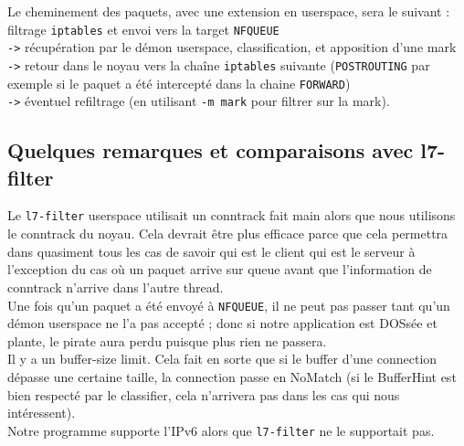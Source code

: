 Le cheminement des paquets, avec une extension en userspace, sera le suivant :\\
filtrage \verb+iptables+ et envoi vers la target \verb+NFQUEUE+\\
\verb+->+ récupération par le démon userspace, classification, et apposition d'une mark\\
\verb+->+ retour dans le noyau vers la chaîne \verb+iptables+ suivante (\verb+POSTROUTING+ par exemple si le paquet a été intercepté dans la chaine \verb+FORWARD+)\\
\verb+->+ éventuel refiltrage (en utilisant \verb+-m mark+ pour filtrer sur la mark).


\subsection{Quelques remarques et comparaisons avec l7-filter}
Le \verb+l7-filter+ userspace utilisait un conntrack fait main alors que nous utilisons le conntrack du noyau. Cela devrait être plus efficace parce que cela permettra dans quasiment tous les cas de savoir qui est le client qui est le serveur à l'exception du cas où un paquet arrive sur \og queue \fg{} avant que l'information de conntrack n'arrive dans l'autre thread.\\

Une fois qu'un paquet a été envoyé à \verb+NFQUEUE+, il ne peut pas passer
tant qu'un démon userspace ne l'a pas accepté ; donc si notre application est
DOSsée et plante, le pirate aura perdu puisque plus rien ne passera.\\

Il y a un buffer-size limit. Cela fait en sorte que si le
buffer d'une connection dépasse une certaine taille, la connection
passe en NoMatch (si le BufferHint est bien respecté par le
classifier, cela n'arrivera pas dans les cas qui nous intéressent).\\

Notre programme supporte l'IPv6 alors que \verb+l7-filter+ ne le supportait pas.